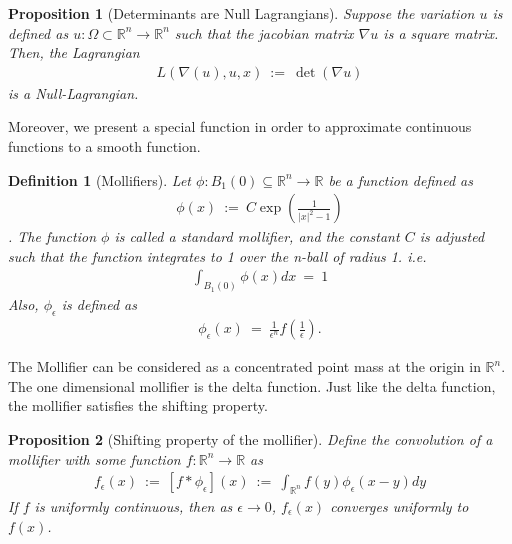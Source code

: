 \documentclass[10pt]{article}
\numberwithin{equation}{section}
\newcommand{\RR}{\mathbb{R}}
\newtheorem{proposition}{Proposition}
\newtheorem{definition}{Definition}
\numberwithin{theorem}{section}
\numberwithin{proposition}{section}
\numberwithin{lemma}{section}
\numberwithin{corollary}{section}
\numberwithin{remark}{section}
\numberwithin{definition}{section}
\numberwithin{example}{section}
\numberwithin{conjecture}{section}
\numberwithin{question}{section}
\begin{document}
\begin{proposition} [Determinants are Null Lagrangians]
    Suppose the variation $u$ is defined as $u:\Omega \subset \RR^n \rightarrow \RR^n$ 
    such that the jacobian matrix $\nabla u$ is a square matrix. Then, 
    the Lagrangian 
    \begin{align}
        L(\nabla(u), u, x) \ := \ \det(\nabla u)
    \end{align}
    is a Null-Lagrangian. 
\end{proposition}

Moreover, we present a special function in order to approximate 
continuous functions to a smooth function. 

\begin{definition} [Mollifiers]
    Let $\phi:B_1(0) \subseteq \RR^n \rightarrow \RR$ be a function defined as 
    \begin{align}
        \phi(x) \ := \ 
        C \exp\left(
            \frac 1 {|x|^2 - 1}
        \right)
    \end{align}. 
    The function $\phi$ is called a standard mollifier, and the 
    constant $C$ is adjusted such that the function integrates to 1 over 
    the n-ball of radius 1. i.e. 
    \begin{align}
        \int_{B_1(0)} \phi(x) dx \ = \ 1
    \end{align}
    Also, $\phi_\epsilon$ is defined as 
    \begin{align}
        \phi_\epsilon(x) \ = \ \frac 1 {\epsilon^n} f\left(
            \frac 1 \epsilon
        \right).
    \end{align}
\end{definition}
    The Mollifier can be considered as a concentrated point mass at the origin 
    in $\RR^n$. The one dimensional mollifier is the delta function. Just 
    like the delta function, the mollifier satisfies the shifting property. 

    \begin{proposition} [Shifting property of the mollifier]
        Define the convolution of a mollifier with some function $f:\RR^n \rightarrow \RR$
         as 
        \begin{align}
            f_\epsilon(x) \ := \ [f * \phi_\epsilon](x) \ := \ 
            \int_{\RR^n} f(y) \phi_\epsilon(x - y) dy
        \end{align}
        If $f$ is uniformly continuous, then as $\epsilon \rightarrow 0$, 
        $f_\epsilon(x)$ converges uniformly to $f(x)$.  
    \end{proposition}
\end{document}
